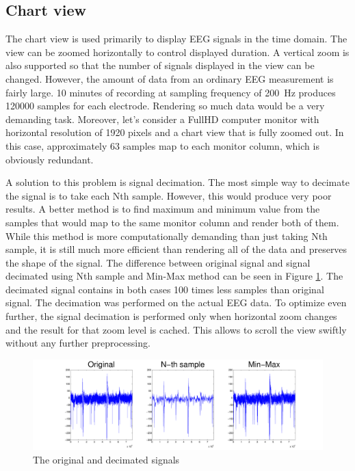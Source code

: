 \subsection{Chart view}
\label{ssec:ChartView}
The chart view is used primarily to display EEG signals in the time domain. The view can be zoomed horizontally to control displayed duration. A vertical zoom is also supported so that the number of signals displayed in the view can be changed. However, the amount of data from an ordinary EEG measurement is fairly large. 10 minutes of recording at sampling frequency of \SI{200}{\Hz} produces 120000 samples for each electrode. Rendering so much data would be a very demanding task. Moreover, let's consider a FullHD computer monitor with horizontal resolution of 1920 pixels and a chart view that is fully zoomed out. In this case, approximately 63 samples map to each monitor column, which is obviously redundant.

A solution to this problem is signal decimation. The most simple way to decimate the signal is to take each Nth sample. However, this would produce very poor results. A better method is to find maximum and minimum value from the samples that would map to the same monitor column and render both of them. While this method is more computationally demanding than just taking Nth sample, it is still much more efficient than rendering all of the data and preserves the shape of the signal. The difference between original signal and signal decimated using Nth sample and Min-Max method can be seen in Figure \ref{fig:SignalDecimation}. The decimated signal contains in both cases 100 times less samples than original signal. The decimation was performed on the actual EEG data. To optimize even further, the signal decimation is performed only when horizontal zoom changes and the result for that zoom level is cached. This allows to scroll the view swiftly without any further preprocessing.

\begin{figure}[ht]
	\centering
	\includegraphics[width=1\linewidth]{fig/signalDec.pdf}
	\caption{The original and decimated signals}
	\label{fig:SignalDecimation}
\end{figure}

